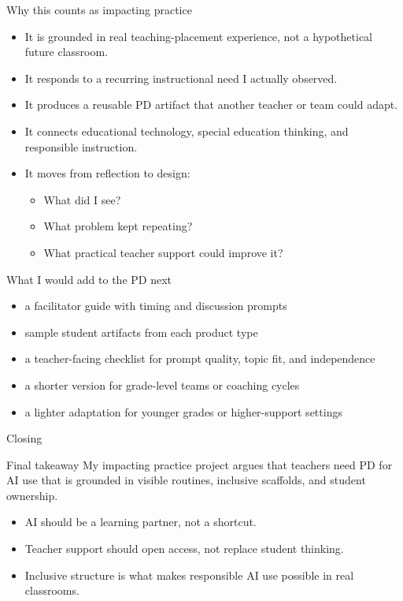 \documentclass[aspectratio=169,11pt]{beamer}
\begin{document}
\begin{frame}{Why this counts as impacting practice}
\begin{itemize}
  \item It is grounded in real teaching-placement experience, not a hypothetical future classroom.
  \item It responds to a recurring instructional need I actually observed.
  \item It produces a reusable PD artifact that another teacher or team could adapt.
  \item It connects educational technology, special education thinking, and responsible instruction.
  \item It moves from reflection to design:
  \begin{itemize}
    \item What did I see?
    \item What problem kept repeating?
    \item What practical teacher support could improve it?
  \end{itemize}
\end{itemize}
\end{frame}

\begin{frame}{What I would add to the PD next}
\begin{itemize}
  \item a facilitator guide with timing and discussion prompts
  \item sample student artifacts from each product type
  \item a teacher-facing checklist for prompt quality, topic fit, and independence
  \item a shorter version for grade-level teams or coaching cycles
  \item a lighter adaptation for younger grades or higher-support settings
\end{itemize}
\end{frame}

\begin{frame}{Closing}
\begin{block}{Final takeaway}
\Large My impacting practice project argues that teachers need PD for AI use that is grounded in visible routines, inclusive scaffolds, and student ownership.
\end{block}

\vspace{0.25cm}
\begin{itemize}
  \item AI should be a learning partner, not a shortcut.
  \item Teacher support should open access, not replace student thinking.
  \item Inclusive structure is what makes responsible AI use possible in real classrooms.
\end{itemize}
\end{frame}
\end{document}
